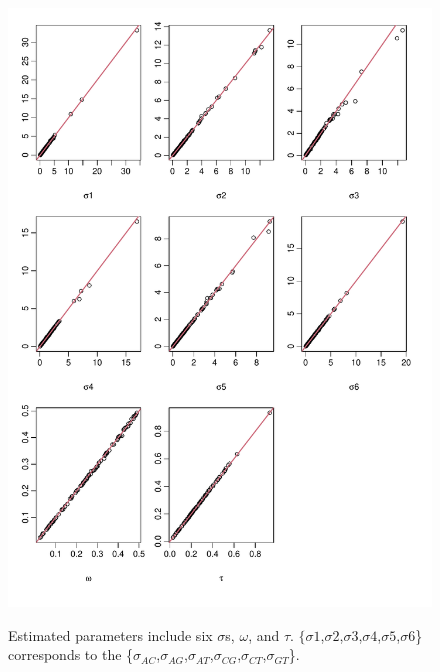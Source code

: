 \pagebreak
\begin{figure}[H]
     \begin{minipage}[t]{1\textwidth}
     \includegraphics[width=1\linewidth,height=1.2\linewidth]{Fig2.pdf}
     { Estimated parameters include six $\sigma$s, $\omega$, and $\tau$. $\{\sigma1$,$\sigma2$,$\sigma3$,$\sigma4$,$\sigma5$,$\sigma6$\} corresponds to the \{$\sigma_{AC}$,$\sigma_{AG}$,$\sigma_{AT}$,$\sigma_{CG}$,$\sigma_{CT}$,$\sigma_{GT}$\}. 
      \par}
     \end{minipage}
\end{figure}

